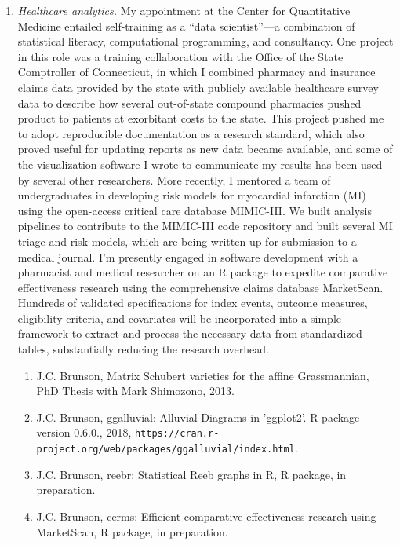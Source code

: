 \documentclass{nihbiosketch}
\begin{document}
\begin{enumerate}
\item \emph{Healthcare analytics.}
My appointment at the Center for Quantitative Medicine entailed self-training as a ``data scientist''---a combination of statistical literacy, computational programming, and consultancy. One project in this role was a training collaboration with the Office of the State Comptroller of Connecticut, in which I combined pharmacy and insurance claims data provided by the state with publicly available healthcare survey data to describe how several out-of-state compound pharmacies pushed product to patients at exorbitant costs to the state. This project pushed me to adopt reproducible documentation as a research standard, which also proved useful for updating reports as new data became available, and some of the visualization software I wrote to communicate my results has been used by several other researchers.
More recently, I mentored a team of undergraduates in developing risk models for myocardial infarction (MI) using the open-access critical care database MIMIC-III. We built analysis pipelines to contribute to the MIMIC-III code repository and built several MI triage and risk models, which are being written up for submission to a medical journal.
I'm presently engaged in software development with a pharmacist and medical researcher on an R package to expedite comparative effectiveness research using the comprehensive claims database MarketScan. Hundreds of validated specifications for index events, outcome measures, eligibility criteria, and covariates will be incorporated into a simple framework to extract and process the necessary data from standardized tables, substantially reducing the research overhead.

\begin{enumerate}
\item J.C. Brunson, Matrix Schubert varieties for the affine Grassmannian, PhD Thesis with Mark Shimozono, 2013.
\item J.C. Brunson, ggalluvial: Alluvial Diagrams in 'ggplot2'. R package version 0.6.0., 2018, \texttt{\nolinkurl{https://cran.r-project.org/web/packages/ggalluvial/index.html}}.
\item J.C. Brunson, reebr: Statistical Reeb graphs in R, R package, in preparation.
\item J.C. Brunson, cerms: Efficient comparative effectiveness research using MarketScan, R package, in preparation.
\end{enumerate}

\end{enumerate}
\end{document}
